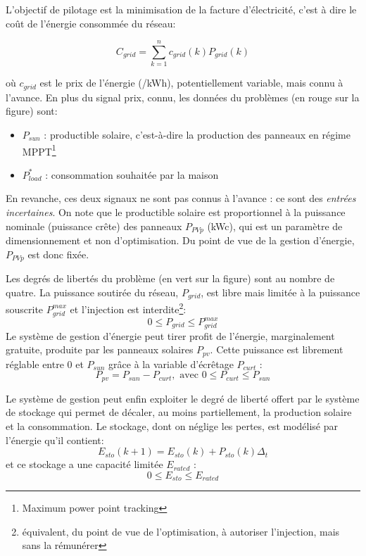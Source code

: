\documentclass[a4paper,10pt,twocolumn]{article}
\begin{document}
L'objectif de pilotage est la minimisation de la facture d'électricité,
c'est à dire le coût de l'énergie consommée du réseau:

\begin{equation} \label{eq:C_grid}
  C_{grid} = \sum_{k=1}^{n} c_{grid}(k)P_{grid}(k)
\end{equation}

où $c_{grid}$ est le prix de l'énergie (\texteuro/kWh), potentiellement variable,
mais connu à l'avance.
En plus du signal prix, connu, les données du problèmes (en rouge sur la figure) sont:

\begin{itemize}
 \item $P_{sun}$ : productible solaire, c'est-à-dire la production des panneaux en régime
MPPT\footnote{Maximum power point tracking}
 \item $P_{load}^*$ : consommation souhaitée par la maison
\end{itemize}

En revanche, ces deux signaux ne sont pas connus à l'avance :
ce sont des \emph{entrées incertaines}.
On note que le productible solaire est proportionnel
à la puissance nominale (puissance crête) des panneaux $P_{PVp}$ (kWc),
qui est un paramètre de dimensionnement et non d'optimisation.
Du point de vue de la gestion d'énergie, $P_{PVp}$ est donc fixée.

Les degrés de libertés du problème (en vert sur la figure) sont au nombre de quatre.
La puissance soutirée du réseau, $P_{grid}$,
est libre mais limitée à la puissance souscrite $P_{grid}^{max}$
et l'injection est interdite\footnote{
équivalent, du point de vue de l'optimisation, à autoriser l'injection, mais sans la rémunérer}:
%
\begin{equation}
  0 \leq P_{grid} \leq P_{grid}^{max}
\end{equation}
%
Le système de gestion d'énergie peut tirer profit de l'énergie, marginalement
gratuite, produite par les panneaux solaires $P_{pv}$.
Cette puissance est librement réglable entre 0 et $P_{sun}$ grâce à la variable
d'écrêtage $P_{curt}$ :
%
\begin{equation}
  P_{pv} = P_{sun} - P_{curt}, \text{ avec } 0 \leq P_{curt} \leq P_{sun}
\end{equation}

Le système de gestion peut enfin exploiter le degré de liberté offert par
le système de stockage qui permet de décaler, au moins partiellement,
la production solaire et la consommation.
Le stockage, dont on néglige les pertes, est modélisé par l'énergie qu'il contient:
%
\begin{equation}
  E_{sto}(k+1) = E_{sto}(k) + P_{sto}(k)\Delta_t
\end{equation}
%
et ce stockage a une capacité limitée $E_{rated}$ :
%
\begin{equation}
  0 \leq E_{sto} \leq E_{rated}
\end{equation}
\end{document}
